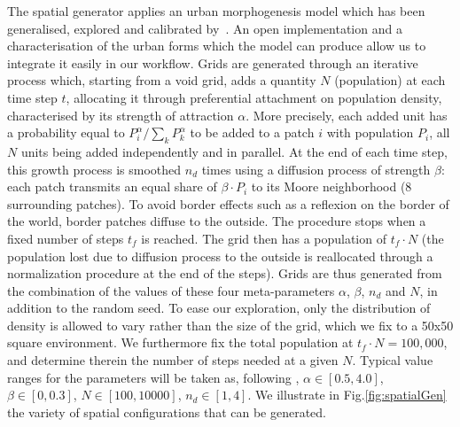 \documentclass[preprint,5p,times,twocolumn,authoryear]{elsarticle}
\begin{document}
The spatial generator applies an urban morphogenesis model \citep{Batty2007} which has been generalised, explored and calibrated by~\citet{2017arXiv170806743R}. An open implementation and a characterisation of the urban forms which the model can produce allow us to integrate it easily in our workflow. Grids are generated through an iterative process which, starting from a void grid, adds a quantity $N$ (population) at each time step $t$, allocating it through preferential attachment on population density, characterised by its strength of attraction $\alpha$. More precisely, each added unit has a probability equal to $P_i^{\alpha}/\sum_k P_k^{\alpha}$ to be added to a patch $i$ with population $P_i$, all $N$ units being added independently and in parallel. At the end of each time step, this growth process is smoothed $n_d$ times using a diffusion process of strength $\beta$: each patch transmits an equal share of $\beta\cdot P_i$ to its Moore neighborhood (8 surrounding patches). To avoid border effects such as a reflexion on the border of the world, border patches diffuse to the outside. The procedure stops when a fixed number of steps $t_f$ is reached. The grid then has a population of $t_f \cdot N$ (the population lost due to diffusion process to the outside is reallocated through a normalization procedure at the end of the steps). Grids are thus generated from the combination of the values of these four meta-parameters $\alpha$, $\beta$, $n_d$ and $N$, in addition to the random seed. To ease our exploration, only the distribution of density is allowed to vary rather than the size of the grid, which we fix to a 50x50 square environment. We furthermore fix the total population at $t_f\cdot N = 100,000$, and determine therein the number of steps needed at a given $N$. Typical value ranges for the  parameters will be taken as, following \citet{2017arXiv170806743R}, $\alpha\in\left[0.5,4.0\right]$, $\beta \in\left[0,0.3\right] $, $N\in \left[100,10000\right]$, $n_d\in\left[1,4\right]$. We illustrate in Fig.\ref{fig:spatialGen} the variety of spatial configurations that can be generated.
\end{document}
